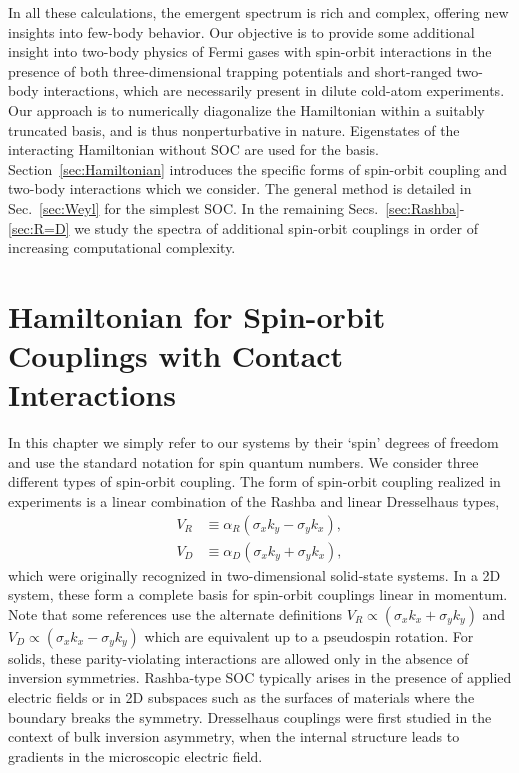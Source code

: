 In all these calculations, the emergent spectrum is rich and complex, offering new insights into few-body behavior.  Our objective is to provide some additional insight into two-body physics of Fermi gases with spin-orbit interactions in the presence of both three-dimensional trapping potentials and short-ranged two-body interactions, which are necessarily present in dilute cold-atom experiments. Our approach is to numerically diagonalize the Hamiltonian within a suitably truncated basis, and is thus nonperturbative in nature. Eigenstates of the interacting Hamiltonian without SOC are used for the basis. Section~\ref{sec:Hamiltonian} introduces the specific forms of spin-orbit coupling and two-body interactions which we consider. The general method is detailed in Sec.~\ref{sec:Weyl} for the simplest SOC.  In the remaining Secs.~\ref{sec:Rashba}-\ref{sec:R=D} we study the spectra of additional spin-orbit couplings in order of increasing computational complexity.

\section{\label{sec:Hamiltonian}Hamiltonian for Spin-orbit Couplings with Contact Interactions}

In this chapter we simply refer to our systems by their `spin' degrees of freedom and use the standard notation for spin quantum numbers. We consider three different types of spin-orbit coupling. The form of spin-orbit coupling realized in experiments is a linear combination of the Rashba \cite{0022-3719-17-33-015} and linear Dresselhaus \cite{PhysRev.100.580} types,
\begin{align}
V_{R}&\equiv\alpha_R (\sigma_x k_y-\sigma_y k_x) \label{eq:Rashba},\\
V_{D}&\equiv\alpha_D (\sigma_x k_y+\sigma_y k_x) \label{eq:Dresselhaus},
\end{align} 
which were originally recognized in two-dimensional solid-state systems. In a 2D system, these form a complete basis for spin-orbit couplings linear in momentum. Note that some references use the alternate definitions $V_R\propto  (\sigma_x k_x+\sigma_y k_y) $ and $V_D\propto  (\sigma_x k_x-\sigma_y k_y) $ which are equivalent up to a pseudospin rotation.  For solids, these parity-violating interactions are allowed only in the absence of inversion symmetries. Rashba-type SOC typically arises in the presence of applied electric fields or in 2D subspaces such as the surfaces of materials where the boundary breaks the symmetry. Dresselhaus couplings were first studied in the context of bulk inversion asymmetry, when the internal structure leads to gradients in the microscopic electric field. 

